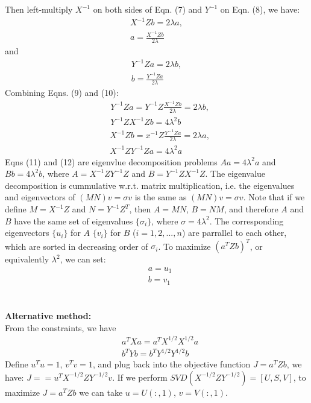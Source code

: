 \documentclass[11pt]{article}
\begin{document}
Then left-multiply $X^{-1}$ on both sides of Eqn. (7) and $Y^{-1}$ on Eqn. (8), we have:
\begin{equation}
	\begin{aligned}
		X^{-1}Zb=2\lambda a, \\
		a=\frac{X^{-1}Zb}{2\lambda}
	\end{aligned}
\end{equation}
and 
\begin{equation}
	\begin{aligned}
		Y^{-1}Za=2\lambda b, \\
		b=\frac{Y^{-1}Za}{2\lambda }
	\end{aligned}
\end{equation}
Combining Eqns. (9) and (10):
\begin{equation}
\begin{aligned}
	&Y^{-1}Za=Y^{-1}Z\frac{X^{-1}Zb}{2\lambda}=2\lambda b, \\
	&Y^{-1}ZX^{-1}Zb=4\lambda^2b
\end{aligned}
\end{equation}
\begin{equation}
	\begin{aligned}
		&X^{-1}Zb=x^{-1}Z\frac{Y^{-1}Za}{2\lambda}=2\lambda a, \\
		&X^{-1}ZY^{-1}Za=4\lambda^2a
	\end{aligned}
\end{equation}
Eqns (11) and (12) are eigenvlue decomposition problems $Aa=4\lambda^2a$ and $Bb=4\lambda^2b$, where $A=X^{-1}ZY^{-1}Z$ and $B=Y^{-1}ZX^{-1}Z$.
The eigenvalue decomposition is cummulative w.r.t. matrix multiplication, i.e. the eigenvalues and eigenvectors of $(MN)v=\sigma v$ is the same as $(MN)v=\sigma v$. Note that if we define $M=X^{-1}Z$ and $N=Y^{-1}Z^T$, then $A=MN$, $B=NM$, and therefore $A$ and $B$ have the same set of eigenvalues $\{\sigma_i\}$, where $\sigma=4\lambda^2$. The corresponding eigenvectors $\{u_i\}$ for $A$ $\{v_i\}$ for $B$ ($i=1,2,...,n$) are parrallel to each other, which are sorted in decreasing order of $\sigma_i$. To maximize $(a^TZb)^T$, or equivalently $\lambda^2$, we can set:
\begin{equation}
	\begin{aligned}
		&a=u_1\\
		&b=v_1
	\end{aligned}
\end{equation}\\ \\

\textbf{Alternative method:}\\
From the constraints, we have
\begin{equation}
	\begin{aligned}
		&a^TXa=a^TX^{1/2}X^{1/2}a\\
		&b^TYb=b^TY^{1/2}Y^{1/2}b
	\end{aligned}
\end{equation}
Define $u^Tu=1$, $v^Tv=1$, and plug back into the objective function $J=a^TZb$, we have: $J==u^TX^{-1/2}ZY^{-1/2}v$. If we perform $SVD(X^{-1/2}ZY^{-1/2})=[U,S,V]$, to maximize $J=a^TZb$ we can take $u=U(:,1)$, $v=V(:,1)$.
 
\end{document}
